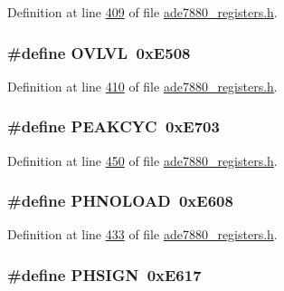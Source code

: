 Definition at line \hyperlink{a00036_source_l00409}{409} of file \hyperlink{a00036_source}{ade7880\-\_\-registers.\-h}.

\hypertarget{a00036_acceeea16d6256d808598f6191aae5601}{
\subsubsection[{O\-V\-L\-V\-L}]{\setlength{\rightskip}{0pt plus 5cm}\#define O\-V\-L\-V\-L~0x\-E508}}\label{de/d8c/a00036_acceeea16d6256d808598f6191aae5601}


Definition at line \hyperlink{a00036_source_l00410}{410} of file \hyperlink{a00036_source}{ade7880\-\_\-registers.\-h}.

\hypertarget{a00036_aab38f75e935804d90a60ddee3bb96962}{
\subsubsection[{P\-E\-A\-K\-C\-Y\-C}]{\setlength{\rightskip}{0pt plus 5cm}\#define P\-E\-A\-K\-C\-Y\-C~0x\-E703}}\label{de/d8c/a00036_aab38f75e935804d90a60ddee3bb96962}


Definition at line \hyperlink{a00036_source_l00450}{450} of file \hyperlink{a00036_source}{ade7880\-\_\-registers.\-h}.

\hypertarget{a00036_a603a075882edcbaa63c480c44f436947}{
\subsubsection[{P\-H\-N\-O\-L\-O\-A\-D}]{\setlength{\rightskip}{0pt plus 5cm}\#define P\-H\-N\-O\-L\-O\-A\-D~0x\-E608}}\label{de/d8c/a00036_a603a075882edcbaa63c480c44f436947}


Definition at line \hyperlink{a00036_source_l00433}{433} of file \hyperlink{a00036_source}{ade7880\-\_\-registers.\-h}.

\hypertarget{a00036_a0d8bb1933bd9e9967444329b9f43d89c}{
\subsubsection[{P\-H\-S\-I\-G\-N}]{\setlength{\rightskip}{0pt plus 5cm}\#define P\-H\-S\-I\-G\-N~0x\-E617}}\label{de/d8c/a00036_a0d8bb1933bd9e9967444329b9f43d89c}


